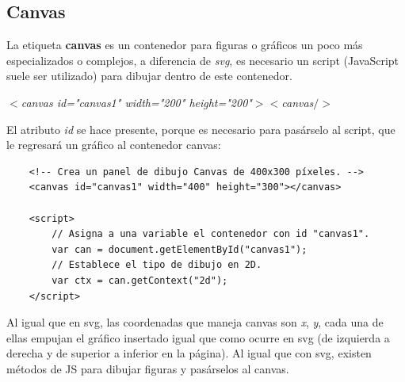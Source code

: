 \subsection{Canvas}
\hspace{0.55cm}La etiqueta \textbf{canvas} es un contenedor para figuras o gráficos un poco más especializados o complejos, a diferencia de \textit{svg}, es necesario un script (JavaScript suele ser utilizado) para dibujar dentro de este contenedor.
\begin{center}
    \textit{$<$canvas id="canvas1" width="200" height="200"$>$$<$canvas$/>$}
\end{center}

El atributo \textit{id} se hace presente, porque es necesario para pasárselo al script, que le regresará un gráfico al contenedor canvas:
\begin{lstlisting}
    <!-- Crea un panel de dibujo Canvas de 400x300 píxeles. -->
    <canvas id="canvas1" width="400" height="300"></canvas> 

    <script>
        // Asigna a una variable el contenedor con id "canvas1".
        var can = document.getElementById("canvas1"); 
        // Establece el tipo de dibujo en 2D.
        var ctx = can.getContext("2d");
    </script>
\end{lstlisting}

Al igual que en svg, las coordenadas que maneja canvas son \textit{x}, \textit{y}, cada una de ellas empujan el gráfico insertado igual que como ocurre en svg (de izquierda a derecha y de superior a inferior en la página). Al igual que con svg, existen métodos de JS para dibujar figuras y pasárselos al canvas.

